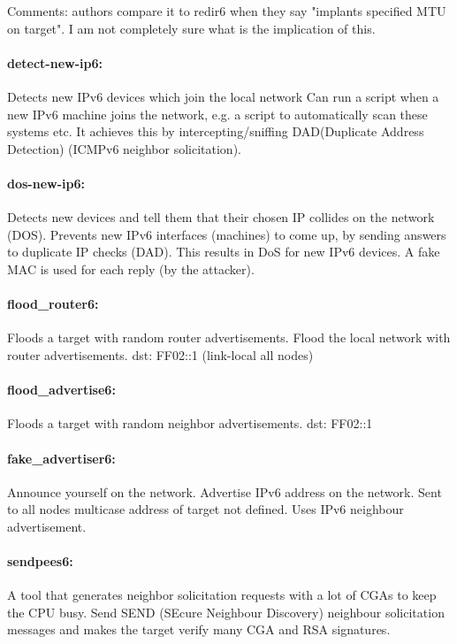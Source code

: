 \documentclass{article}
\begin{document}
Comments: authors compare it to redir6 when they say "implants specified MTU on target". I am not completely sure what is the implication of this.

\paragraph*{detect-new-ip6:} Detects new IPv6 devices which join the local network Can run a script when a new IPv6 machine joins the network, e.g. a script to automatically scan these systems etc. It achieves this by intercepting/sniffing DAD(Duplicate Address Detection) (ICMPv6 neighbor solicitation).

\paragraph*{dos-new-ip6:} Detects new devices and tell them that their chosen IP
   collides on the network (DOS). Prevents new IPv6 interfaces (machines) to come up, by sending answers to duplicate IP checks (DAD). This results in DoS for new IPv6 devices. A fake MAC is used for each reply (by the attacker).

\paragraph*{flood\_router6:} Floods a target with random router advertisements. Flood the local network with router advertisements. dst: FF02::1 (link-local all nodes)

\paragraph*{flood\_advertise6:} Floods a target with random neighbor advertisements. dst: FF02::1

\paragraph*{fake\_advertiser6:} Announce yourself on the network. Advertise IPv6 address on the network. Sent to all nodes multicase address of target not defined. Uses IPv6 neighbour advertisement.   

\paragraph*{sendpees6:} A tool that generates neighbor solicitation requests with a lot of CGAs to keep the
   CPU busy. Send SEND (SEcure Neighbour Discovery) neighbour solicitation messages and makes the target verify many CGA and RSA signatures.  
 
\end{document}
